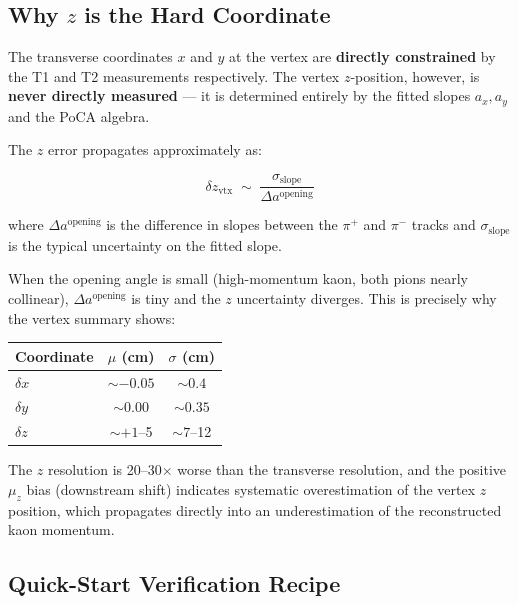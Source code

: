 \subsection{Why \texorpdfstring{$z$}{z} is the Hard Coordinate}

The transverse coordinates $x$ and $y$ at the vertex are
\textbf{directly constrained} by the T1 and T2 measurements respectively.
The vertex $z$-position, however, is \textbf{never directly measured} --- it
is determined entirely by the fitted slopes $a_x, a_y$ and the PoCA algebra.

The $z$ error propagates approximately as:

\begin{equation}
    \delta z_\text{vtx} \;\sim\; \frac{\sigma_\text{slope}}{\Delta a^\text{opening}}
\end{equation}

where $\Delta a^\text{opening}$ is the difference in slopes between the
$\pi^+$ and $\pi^-$ tracks and $\sigma_\text{slope}$ is the typical
uncertainty on the fitted slope.

When the opening angle is small (high-momentum kaon, both pions nearly
collinear), $\Delta a^\text{opening}$ is tiny and the $z$ uncertainty diverges.
This is precisely why the vertex summary shows:

\begin{center}
\begin{tabular}{lcc}
    \toprule
    \textbf{Coordinate} & $\mu$ (cm) & $\sigma$ (cm) \\
    \midrule
    $\delta x$ & $\sim -0.05$ & $\sim 0.4$ \\
    $\delta y$ & $\sim 0.00$  & $\sim 0.35$ \\
    $\delta z$ & $\sim +1$--5 & $\sim 7$--12 \\
    \bottomrule
\end{tabular}
\end{center}

\noindent The $z$ resolution is 20--30$\times$ worse than the transverse
resolution, and the positive $\mu_z$ bias (downstream shift) indicates
systematic overestimation of the vertex $z$ position, which propagates
directly into an underestimation of the reconstructed kaon momentum.

\subsection{Quick-Start Verification Recipe}


